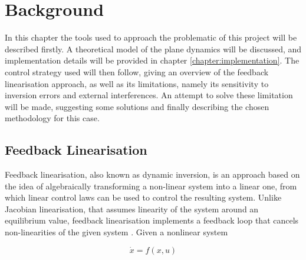 
\chapter{Background}
\label{chapter:background}

In this chapter the tools used to approach the problematic of this project will be described firstly. A theoretical model of the plane dynamics will be discussed, and implementation details will be provided in chapter \ref{chapter:implementation}. The control strategy used will then follow, giving an overview of the feedback linearisation approach, as well as its limitations, namely its sensitivity to inversion errors and external interferences. An attempt to solve these limitation will be made, suggesting some solutions and finally describing the chosen methodology for this case.




\section{Feedback Linearisation}
\label{section:background/NLI}

Feedback linearisation, also known as dynamic inversion, is an approach based on the idea of algebraically transforming a non-linear system into a linear one, from which linear control laws can be used to control the resulting system. Unlike Jacobian linearisation, that assumes linearity of the system around an equilibrium value, feedback linearisation implements a feedback loop that cancels non-linearities of the given system \cite{Slotine+Li}. Given a nonlinear system 

\begin{equation}
\dot{x} = f(x,u)
\label{eq:nonlinear_system}
\end{equation}

